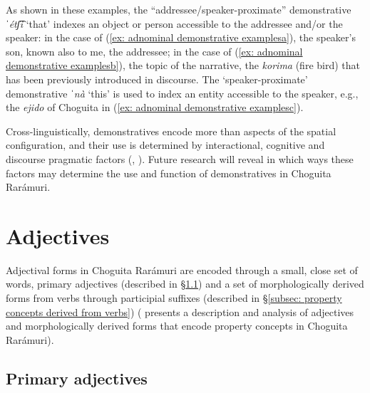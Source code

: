                 \label{ex: adnominal demonstrative examplesd}
    \z
\z

As shown in these examples, the ``addressee/speaker-proximate'' demonstrative \textit{ˈétʃ͡i} `that' indexes an object or person accessible to the addressee and/or the speaker: in the case of (\ref{ex: adnominal demonstrative examplesa}), the speaker's son, known also to me, the addressee; in the case of (\ref{ex: adnominal demonstrative examplesb}), the topic of the narrative, the \textit{korima} (fire bird) that has been previously introduced in discourse. The `speaker-proximate' demonstrative \textit{ˈnà} `this' is used to index an entity accessible to the speaker, e.g., the \textit{ejido} of Choguita in (\ref{ex: adnominal demonstrative examplesc}).

Cross-linguistically, demonstratives encode more than aspects of the spatial configuration, and their use is determined by interactional, cognitive and discourse pragmatic factors (\citealt{enfield2003demonstratives}, \citealt{hanks2005explorations}). Future research will reveal in which ways these factors may determine the use and function of demonstratives in Choguita Rarámuri.

\section{Adjectives}
\label{sec: adjectives}

Adjectival forms in Choguita Rarámuri are encoded through a small, close set of words, primary adjectives (described in §\ref{subsec: primary adectives}) and a set of morphologically derived forms from verbs through participial suffixes (described in §\ref{subsec: property concepts derived from verbs}) (\citet{islas2010caracterizacion} presents a description and analysis of adjectives and morphologically derived forms that encode property concepts in Choguita Rarámuri).

\subsection{Primary adjectives}
\label{subsec: primary adectives}

